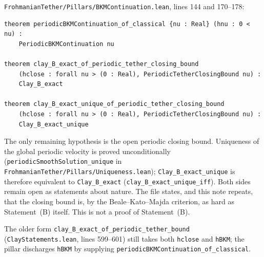 \documentclass[11pt]{article}
\theoremstyle{plain}
\theoremstyle{definition}
\theoremstyle{remark}
\begin{document}
\texttt{FrohmanianTether/\hspace{0pt}Pillars/\hspace{0pt}BKMContinuation.\hspace{0pt}lean}, lines 144 and 170--178:
\begin{lstlisting}
theorem periodicBKMContinuation_of_classical {nu : Real} (hnu : 0 < nu) :
    PeriodicBKMContinuation nu

theorem clay_B_exact_of_periodic_tether_closing_bound
    (hclose : forall nu > (0 : Real), PeriodicTetherClosingBound nu) :
    Clay_B_exact

theorem clay_B_exact_unique_of_periodic_tether_closing_bound
    (hclose : forall nu > (0 : Real), PeriodicTetherClosingBound nu) :
    Clay_B_exact_unique
\end{lstlisting}
The only remaining hypothesis is the open periodic closing bound. Uniqueness of the global periodic velocity is proved unconditionally (\texttt{periodicSmoothSolution\_unique} in \texttt{FrohmanianTether/\hspace{0pt}Pillars/\hspace{0pt}Uniqueness.\hspace{0pt}lean}); \texttt{Clay\_\hspace{0pt}B\_\hspace{0pt}exact\_\hspace{0pt}unique} is therefore equivalent to \texttt{Clay\_\hspace{0pt}B\_\hspace{0pt}exact} (\texttt{clay\_\hspace{0pt}B\_\hspace{0pt}exact\_\hspace{0pt}unique\_\hspace{0pt}iff}). Both sides remain open as statements about nature. The file states, and this note repeats, that the closing bound is, by the Beale--Kato--Majda criterion, as hard as Statement~(B) itself. This is not a proof of Statement~(B).

The older form \texttt{clay\_\hspace{0pt}B\_\hspace{0pt}exact\_\hspace{0pt}of\_\hspace{0pt}periodic\_\hspace{0pt}tether\_\hspace{0pt}bound} (\texttt{ClayStatements.\hspace{0pt}lean}, lines 599--601) still takes both \texttt{hclose} and \texttt{hBKM}; the pillar discharges \texttt{hBKM} by supplying \texttt{periodicBKMContinuation\_\hspace{0pt}of\_\hspace{0pt}classical}.
\end{document}
